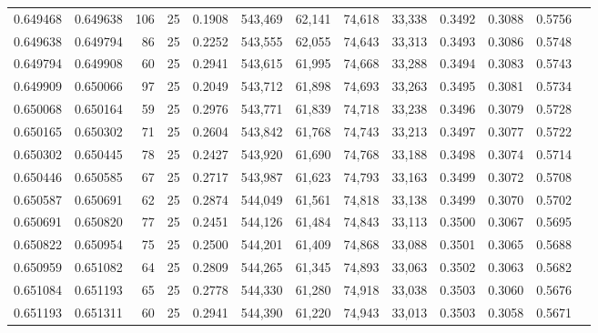 \begin{tabular}{rrrrrrrrrrrrr}
0.649468 & 0.649638 &   106 &  25 &                                     0.1908 & 543,469 &  62,141 &  74,618 &  33,338 & 0.3492 & 0.3088 & 0.5756 \\
0.649638 & 0.649794 &    86 &  25 &                                     0.2252 & 543,555 &  62,055 &  74,643 &  33,313 & 0.3493 & 0.3086 & 0.5748 \\
0.649794 & 0.649908 &    60 &  25 &                                     0.2941 & 543,615 &  61,995 &  74,668 &  33,288 & 0.3494 & 0.3083 & 0.5743 \\
0.649909 & 0.650066 &    97 &  25 &                                     0.2049 & 543,712 &  61,898 &  74,693 &  33,263 & 0.3495 & 0.3081 & 0.5734 \\
0.650068 & 0.650164 &    59 &  25 &                                     0.2976 & 543,771 &  61,839 &  74,718 &  33,238 & 0.3496 & 0.3079 & 0.5728 \\
0.650165 & 0.650302 &    71 &  25 &                                     0.2604 & 543,842 &  61,768 &  74,743 &  33,213 & 0.3497 & 0.3077 & 0.5722 \\
0.650302 & 0.650445 &    78 &  25 &                                     0.2427 & 543,920 &  61,690 &  74,768 &  33,188 & 0.3498 & 0.3074 & 0.5714 \\
0.650446 & 0.650585 &    67 &  25 &                                     0.2717 & 543,987 &  61,623 &  74,793 &  33,163 & 0.3499 & 0.3072 & 0.5708 \\
0.650587 & 0.650691 &    62 &  25 &                                     0.2874 & 544,049 &  61,561 &  74,818 &  33,138 & 0.3499 & 0.3070 & 0.5702 \\
0.650691 & 0.650820 &    77 &  25 &                                     0.2451 & 544,126 &  61,484 &  74,843 &  33,113 & 0.3500 & 0.3067 & 0.5695 \\
0.650822 & 0.650954 &    75 &  25 &                                     0.2500 & 544,201 &  61,409 &  74,868 &  33,088 & 0.3501 & 0.3065 & 0.5688 \\
0.650959 & 0.651082 &    64 &  25 &                                     0.2809 & 544,265 &  61,345 &  74,893 &  33,063 & 0.3502 & 0.3063 & 0.5682 \\
0.651084 & 0.651193 &    65 &  25 &                                     0.2778 & 544,330 &  61,280 &  74,918 &  33,038 & 0.3503 & 0.3060 & 0.5676 \\
0.651193 & 0.651311 &    60 &  25 &                                     0.2941 & 544,390 &  61,220 &  74,943 &  33,013 & 0.3503 & 0.3058 & 0.5671 \\

\end{tabular}
